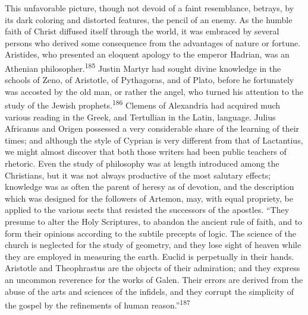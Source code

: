 This unfavorable picture, though not devoid of a faint
resemblance, betrays, by its dark coloring and distorted
features, the pencil of an enemy. As the humble faith of Christ
diffused itself through the world, it was embraced by several
persons who derived some consequence from the advantages of
nature or fortune. Aristides, who presented an eloquent apology
to the emperor Hadrian, was an Athenian philosopher.\textsuperscript{185} Justin
Martyr had sought divine knowledge in the schools of Zeno, of
Aristotle, of Pythagoras, and of Plato, before he fortunately was
accosted by the old man, or rather the angel, who turned his
attention to the study of the Jewish prophets.\textsuperscript{186} Clemens of
Alexandria had acquired much various reading in the Greek, and
Tertullian in the Latin, language. Julius Africanus and Origen
possessed a very considerable share of the learning of their
times; and although the style of Cyprian is very different from
that of Lactantius, we might almost discover that both those
writers had been public teachers of rhetoric. Even the study of
philosophy was at length introduced among the Christians, but it
was not always productive of the most salutary effects; knowledge
was as often the parent of heresy as of devotion, and the
description which was designed for the followers of Artemon, may,
with equal propriety, be applied to the various sects that
resisted the successors of the apostles. “They presume to alter
the Holy Scriptures, to abandon the ancient rule of faith, and to
form their opinions according to the subtile precepts of logic.
The science of the church is neglected for the study of geometry,
and they lose sight of heaven while they are employed in
measuring the earth. Euclid is perpetually in their hands.
Aristotle and Theophrastus are the objects of their admiration;
and they express an uncommon reverence for the works of Galen.
Their errors are derived from the abuse of the arts and sciences
of the infidels, and they corrupt the simplicity of the gospel by
the refinements of human reason.”\textsuperscript{187}




